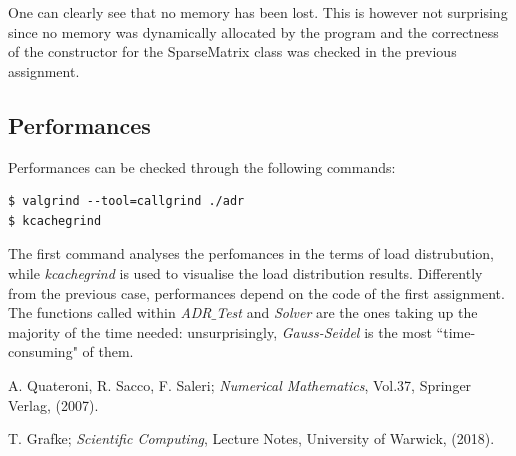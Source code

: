 \documentclass[11pt]{article}
\theoremstyle{theorem}
\theoremstyle{definition}
\begin{document}
One can clearly see that no memory has been lost. This is however not surprising since no memory was dynamically allocated by the program and the correctness of the constructor for the SparseMatrix class was checked in the previous assignment.\\

\subsection{Performances}
\label{subsec:perf}
Performances can be checked through the following commands:
\begin{verbatim}
$ valgrind --tool=callgrind ./adr
$ kcachegrind
\end{verbatim}

The first command analyses the perfomances in the terms of load distrubution, while \emph{kcachegrind} is used to visualise the load distribution results. Differently from the previous case, performances depend on the code of the first assignment. The functions called within \emph{ADR$\_$Test} and \emph{Solver} are the ones taking up the majority of the time needed: unsurprisingly, \emph{Gauss-Seidel} is the most ``time-consuming" of them.\\


\cleardoublepage
\begin{thebibliography}{99}

 A. Quateroni, R. Sacco, F. Saleri;
\emph{Numerical Mathematics}, Vol.37, Springer Verlag, (2007).

 T. Grafke;
\emph{Scientific Computing}, Lecture Notes, University of Warwick, (2018).







\printindex
\end{thebibliography}
\end{document}
